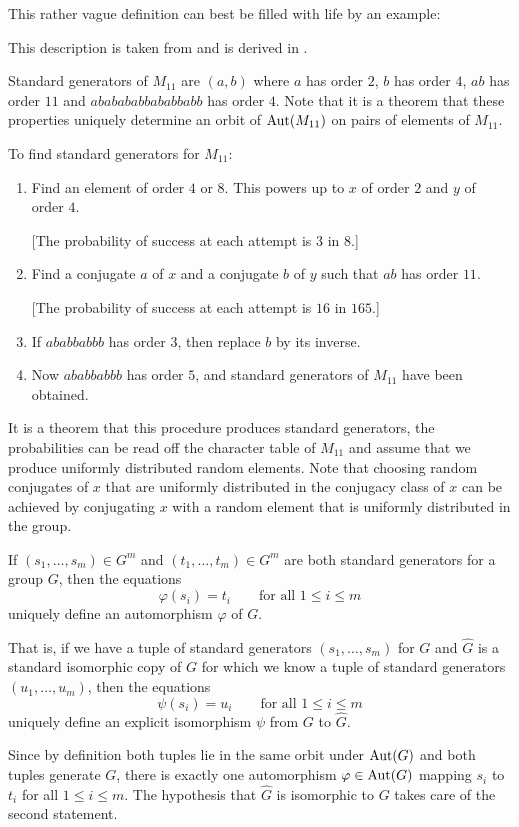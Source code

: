 This rather vague definition can best be filled with life by an
example:

\begin{Exa}
    \label{ExaM11}
    This description is taken from \cite[$M_{11}$ page]{WWWAtlas} and
    is derived in \cite[Example~11]{standgens}.

    Standard generators of $M_{11}$ are $(a,b)$ where $a$ has order $2$, 
$b$ has order $4$, $ab$ has order $11$ and $ababababbababbabb$ has 
order $4$. Note that it is a theorem that these properties uniquely
determine an orbit of $\Aut(M_{11})$ on pairs of elements of $M_{11}$.

\smallskip
To find standard generators for $M_{11}$:
\begin{enumerate}
        \setlength{\parskip}{0pt}
    \item Find an element of order $4$ or $8$. This powers up to $x$ of order 
        $2$ and $y$ of order $4$.

      [The probability of success at each attempt is $3$ in $8$.]
\item Find a conjugate $a$ of $x$ and a conjugate $b$ of $y$ such that $ab$ 
    has order $11$.

      [The probability of success at each attempt is $16$ in $165$.]
  \item If $ababbabbb$ has order $3$, then replace $b$ by its inverse.
  \item Now $ababbabbb$ has order $5$, and standard generators of $M_{11}$ 
      have been obtained.
\end{enumerate}
It is a theorem that this procedure produces standard generators, the
probabilities can be read off the character table of $M_{11}$ and assume
that we produce uniformly distributed random elements.
Note that choosing random conjugates of $x$ that are uniformly distributed in the
conjugacy class of $x$ can be achieved by conjugating $x$ with a random element
that is uniformly distributed in the group.
\end{Exa}

\begin{Prop}
If $(s_1, \ldots, s_m) \in G^m$ and $(t_1, \ldots, t_m) \in G^m$ are 
both standard generators for a group $G$, then the equations
\[ \varphi (s_i) = t_i \qquad\mbox{for all } 1 \le i \le m \]
uniquely define an automorphism $\varphi$ of $G$.

That is, if we have a tuple of standard generators $(s_1, \ldots, s_m)$ for $G$
and $\hat G$ is a standard isomorphic copy of $G$ for which we know
a tuple of standard generators $(u_1, \ldots, u_m)$, then the
equations
\[ \psi (s_i) = u_i \qquad\mbox{for all } 1 \le i \le m \]
uniquely define an explicit isomorphism $\psi$ from $G$ to $\hat G$.
\end{Prop}
\proofbeg
Since by definition both tuples lie in the same orbit under $\Aut(G)$
and both tuples generate $G$, there is exactly one automorphism
$\varphi \in \Aut(G)$ mapping $s_i$ to $t_i$ for all $1 \le i \le m$.
The hypothesis that $\hat G$ is isomorphic to $G$ takes care of the
second statement.
\proofend

